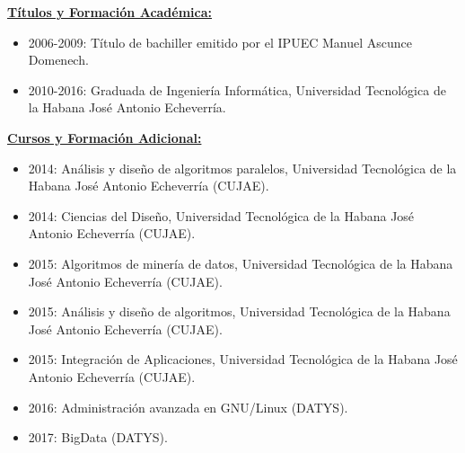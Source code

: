 \documentclass[letterpaper, 12pt, final]{report}
\begin{document}
\pagebreak


\underline{\textbf{Títulos y Formación Académica:}}

\begin{itemize}[noitemsep, nolistsep]
	
	\item 2006-2009: Título de bachiller emitido por el IPUEC Manuel Ascunce Domenech.
	\item 2010-2016: Graduada de Ingeniería Informática, Universidad Tecnológica de la Habana José Antonio Echeverría.\\
	
\end{itemize}


%
%	
%	


\underline{\textbf{Cursos y Formación Adicional:}}

\begin{itemize}[noitemsep, nolistsep]
	
	\item 2014: Análisis y diseño de algoritmos paralelos, Universidad Tecnológica de la Habana José Antonio Echeverría (CUJAE).
	\item 2014: Ciencias del Diseño, Universidad Tecnológica de la Habana José Antonio Echeverría (CUJAE).
	\item 2015: Algoritmos de minería de datos, Universidad Tecnológica de la Habana José Antonio Echeverría (CUJAE).
	\item 2015: Análisis y diseño de algoritmos, Universidad Tecnológica de la Habana José Antonio Echeverría (CUJAE).
	\item 2015: Integración de Aplicaciones, Universidad Tecnológica de la Habana José Antonio Echeverría (CUJAE).
	\item 2016: Administración avanzada en GNU/Linux (DATYS).
	\item 2017: BigData (DATYS).\\
	
\end{itemize}
\end{document}
